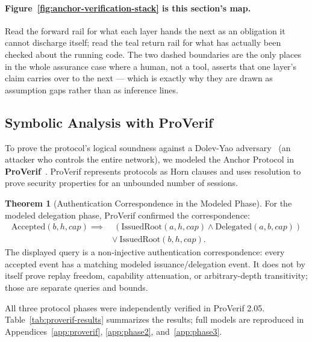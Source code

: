 \documentclass[11pt,a4paper]{article}
\theoremstyle{definition}
\newtheorem{theorem}{Theorem}[section]
\begin{document}


\paragraph{Figure~\ref{fig:anchor-verification-stack} is this section's map.} Read the forward rail for what each layer hands the next as an obligation it cannot discharge itself; read the teal return rail for what has actually been checked about the running code. The two dashed boundaries are the only places in the whole assurance case where a human, not a tool, asserts that one layer's claim carries over to the next --- which is exactly why they are drawn as assumption gaps rather than as inference lines.

\subsection{Symbolic Analysis with ProVerif}

To prove the protocol's logical soundness against a Dolev-Yao adversary~\cite{dolev1983security} (an attacker who controls the entire network), we modeled the Anchor Protocol in \textbf{ProVerif}~\cite{blanchet2016modeling}. ProVerif represents protocols as Horn clauses and uses resolution to prove security properties for an unbounded number of sessions.

\begin{theorem}[Authentication Correspondence in the Modeled Phase]\label{thm:injective}
For the modeled delegation phase, ProVerif confirmed the correspondence:
\begin{align}
\text{Accepted}(b, h, cap) \implies& \ (\text{IssuedRoot}(a, h, cap) \land \text{Delegated}(a, b, cap)) \nonumber\\
& \lor \ \text{IssuedRoot}(b, h, cap).
\end{align}
The displayed query is a non-injective authentication correspondence: every accepted event has a matching modeled issuance/delegation event. It does not by itself prove replay freedom, capability attenuation, or arbitrary-depth transitivity; those are separate queries and bounds.
\end{theorem}

All three protocol phases were independently verified in ProVerif 2.05. Table~\ref{tab:proverif-results} summarizes the results; full models are reproduced in Appendices~\ref{app:proverif}, \ref{app:phase2}, and~\ref{app:phase3}.
\end{document}
